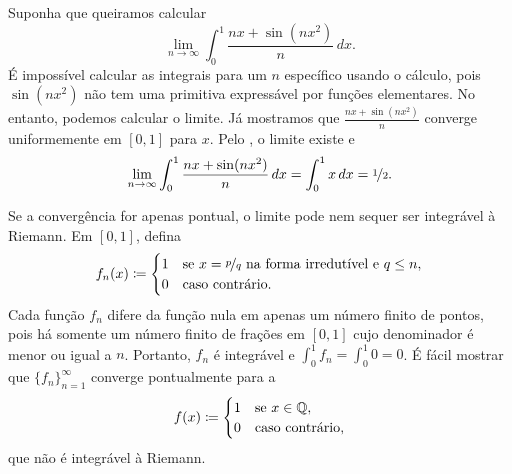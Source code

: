 \begin{example}
Suponha que queiramos calcular
\begin{equation*}
\lim_{n\to\infty} \int_0^1 \frac{nx+ \sin(nx^2)}{n} \,dx .
\end{equation*}
É impossível calcular as integrais para um $n$ específico usando o
cálculo, pois $\sin(nx^2)$ não tem uma primitiva expressável por funções
elementares. No entanto, podemos calcular o limite.
Já mostramos que $\frac{nx+ \sin(nx^2)}{n}$ converge uniformemente em
$[0,1]$ para $x$.
Pelo , o limite existe e
\begin{equation*}
\lim_{n\to\infty} \int_0^1 \frac{nx+ \sin(nx^2)}{n} \,dx
=
\int_0^1
x \,dx = \nicefrac{1}{2} .
\end{equation*}
\end{example}

\begin{example}
Se a convergência for apenas pontual, o limite pode nem sequer ser
integrável à Riemann. Em $[0,1]$, defina
\begin{equation*}
f_n(x) \coloneqq
\begin{cases}
1 & \text{se } x = \nicefrac{p}{q} \text{ na forma irredutível e } q \leq n, \\
0 & \text{caso contrário.}
\end{cases}
\end{equation*}
Cada função $f_n$ difere da função nula em apenas um número finito de
pontos, pois há somente um número finito de frações em $[0,1]$ cujo
denominador é menor ou igual a $n$. Portanto, $f_n$ é integrável e
$\int_0^1 f_n = \int_0^1 0 = 0$. É fácil mostrar que
$\{ f_n \}_{n=1}^\infty$ converge pontualmente para a
\begin{equation*}
f(x) \coloneqq
\begin{cases}
1 & \text{se } x \in {\mathbb{Q}}, \\
0 & \text{caso contrário,}
\end{cases}
\end{equation*}
que não é integrável à Riemann.
\end{example}

